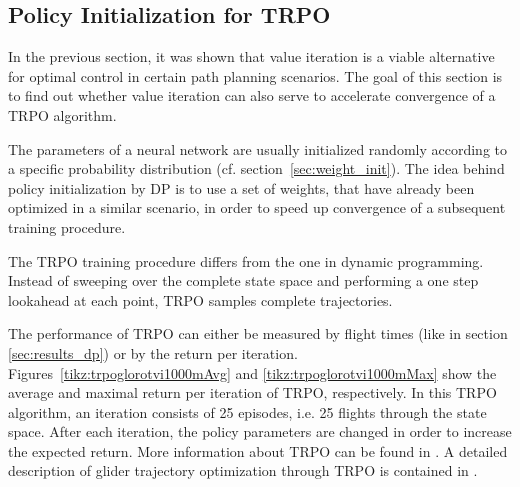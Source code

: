 %	
%	

\newpage
\subsection{Policy Initialization for TRPO}
\label{sec:dp_init_trpo}
In the previous section, it was shown that value iteration is a viable alternative for optimal control in certain path planning scenarios. The goal of this section is to find out whether value iteration can also serve to accelerate convergence of a TRPO algorithm.

The parameters of a neural network are usually initialized randomly according to a specific probability distribution (cf. section~\ref{sec:weight_init}). The idea behind policy initialization by DP is to use a set of weights, that have already been optimized in a similar scenario, in order to speed up convergence of a subsequent training procedure.

The TRPO training procedure differs from the one in dynamic programming. Instead of sweeping over the complete state space and performing a one step lookahead at each point, TRPO samples complete trajectories.

The performance of TRPO can either be measured by flight times (like in section \ref{sec:results_dp}) or by the return per iteration. Figures~\ref{tikz:trpoglorotvi1000mAvg} and \ref{tikz:trpoglorotvi1000mMax} show the average and maximal return per iteration of TRPO, respectively. In this TRPO algorithm, an iteration consists of 25 episodes, i.e. 25 flights through the state space. After each iteration, the policy parameters are changed in order to increase the expected return. More information about TRPO can be found in \cite{DBLP:journals/corr/SchulmanLMJA15}. A detailed description of glider trajectory optimization through TRPO is contained in \cite{Zuern2017}.

